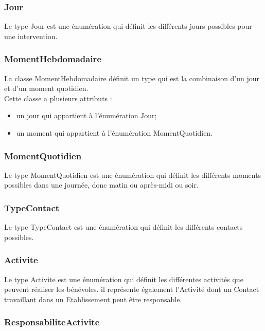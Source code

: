 \subsubsection*{Jour}

Le type Jour est une énumération qui définit les différents jours possibles pour une intervention.

\subsubsection*{MomentHebdomadaire}

La classe MomentHebdomadaire définit un type qui est la combinaison d'un jour et d'un moment quotidien.\\
Cette classe a plusieurs attributs :
\begin{itemize}
\item un jour qui appartient à l'énumération Jour;
\item un moment qui appartient à l'énumération MomentQuotidien.
\end{itemize}

\subsubsection*{MomentQuotidien}

Le type MomentQuotidien est une énumération qui définit les différents moments possibles dans une journée, donc matin ou après-midi ou soir.

\subsubsection*{TypeContact}

Le type TypeContact est une énumération qui définit les différents contacts possibles.

\subsubsection*{Activite}

Le type Activite est une énumération qui définit les différentes activités que peuvent réaliser les bénévoles. il représente également l'Activité dont un Contact travaillant dans un Etablissement peut être responsable.

\subsubsection*{ResponsabiliteActivite}

